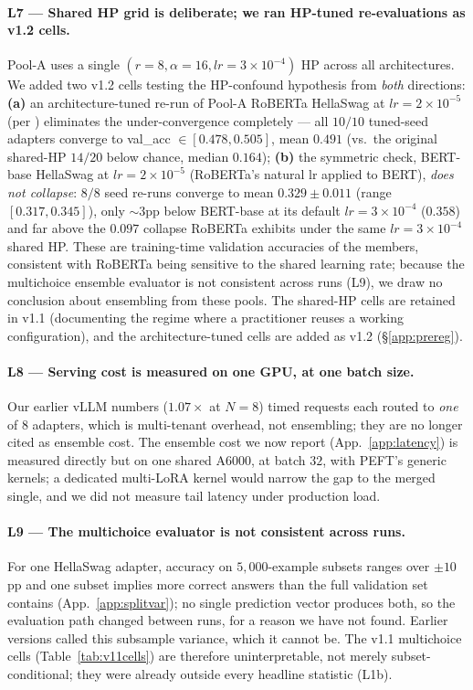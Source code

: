 \documentclass[11pt]{article}
\begin{document}
\paragraph{L7 — Shared HP grid is deliberate; we ran HP-tuned re-evaluations as v1.2 cells.} Pool-A uses a single $(r{=}8, \alpha{=}16, lr{=}3{\times}10^{-4})$ HP across all architectures. We added two v1.2 cells testing the HP-confound hypothesis from \emph{both} directions: \textbf{(a)} an architecture-tuned re-run of Pool-A RoBERTa HellaSwag at $lr{=}2{\times}10^{-5}$ (per \citealp{liu2019roberta}) eliminates the under-convergence completely --- all $10/10$ tuned-seed adapters converge to val\_acc $\in [0.478, 0.505]$, mean $0.491$ (vs.\ the original shared-HP $14/20$ below chance, median $0.164$); \textbf{(b)} the symmetric check, BERT-base HellaSwag at $lr{=}2{\times}10^{-5}$ (RoBERTa's natural lr applied to BERT), \emph{does not collapse}: $8/8$ seed re-runs converge to mean $0.329 \pm 0.011$ (range $[0.317, 0.345]$), only $\sim 3$pp below BERT-base at its default $lr{=}3{\times}10^{-4}$ ($0.358$) and far above the $0.097$ collapse RoBERTa exhibits under the same $lr{=}3{\times}10^{-4}$ shared HP. These are training-time validation accuracies of the members, consistent with RoBERTa being sensitive to the shared learning rate; because the multichoice ensemble evaluator is not consistent across runs (L9), we draw no conclusion about ensembling from these pools. The shared-HP cells are retained in v1.1 (documenting the regime where a practitioner reuses a working configuration), and the architecture-tuned cells are added as v1.2 (\S\ref{app:prereg}).

\paragraph{L8 — Serving cost is measured on one GPU, at one batch size.} Our earlier vLLM numbers ($1.07\times$ at $N{=}8$) timed requests each routed to \emph{one} of $8$ adapters, which is multi-tenant overhead, not ensembling; they are no longer cited as ensemble cost. The ensemble cost we now report (App.~\ref{app:latency}) is measured directly but on one shared A6000, at batch $32$, with PEFT's generic kernels; a dedicated multi-LoRA kernel \citep{chen2024punica,sheng2024slora} would narrow the gap to the merged single, and we did not measure tail latency under production load.

\paragraph{L9 — The multichoice evaluator is not consistent across runs.} For one HellaSwag adapter, accuracy on $5{,}000$-example subsets ranges over $\pm 10$pp and one subset implies more correct answers than the full validation set contains (App.~\ref{app:splitvar}); no single prediction vector produces both, so the evaluation path changed between runs, for a reason we have not found. Earlier versions called this subsample variance, which it cannot be. The v1.1 multichoice cells (Table~\ref{tab:v11cells}) are therefore uninterpretable, not merely subset-conditional; they were already outside every headline statistic (L1b).
\end{document}
